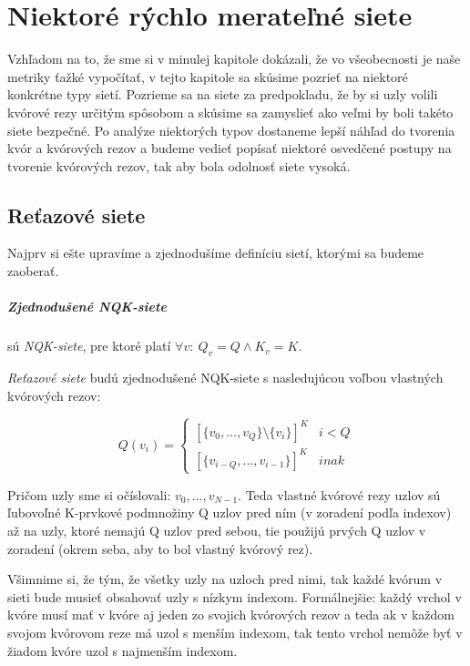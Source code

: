 \chapter{Niektoré rýchlo merateľné siete}

Vzhľadom na to, že sme si v minulej kapitole dokázali, že vo všeobecnosti
je naše metriky ťažké vypočítať, v tejto kapitole sa skúsime pozrieť na niektoré
konkrétne typy sietí. Pozrieme sa na siete za predpokladu, že by si uzly volili
kvórové rezy určitým spôsobom a skúsime sa zamyslieť ako veľmi by boli takéto
siete bezpečné.
Po analýze niektorých typov dostaneme lepší náhľad do tvorenia kvór a
kvórových rezov a budeme vedieť popísať niektoré osvedčené postupy na tvorenie
kvórových rezov, tak aby bola odolnosť siete vysoká.

\section {Reťazové siete}

Najprv si ešte upravíme a zjednodušíme definíciu sietí, ktorými sa budeme zaoberať.

\paragraph{Zjednodušené NQK-siete} sú \textit{NQK-siete}, pre ktoré platí
$\forall v:\:Q_v=Q\land K_v=K$.

\vspace{3mm}
\textit{Reťazové siete} budú zjednodušené NQK-siete s nasledujúcou voľbou
vlastných kvórových rezov:

$$Q(v_i)= \begin{cases}
            [\{v_0, ..., v_Q\} \setminus \{v_i\}]^K & i < Q \\
            [\{v_{i-Q}, ..., v_{i-1}\}]^K & inak
          \end{cases}$$

Pričom uzly sme si očíslovali: $v_0, ..., v_{N-1}$.
Teda vlastné kvórové rezy uzlov sú ľubovoľné K-prvkové podmnožiny Q uzlov pred ním
(v zoradení podľa indexov) až na uzly, ktoré nemajú Q uzlov pred sebou, tie
použijú prvých Q uzlov v zoradení (okrem seba, aby to bol vlastný kvórový rez).

Všimnime si, že tým, že všetky uzly  na uzloch pred nimi, tak
každé kvórum v sieti bude musieť obsahovať uzly s nízkym indexom.
Formálnejšie:
každý vrchol v kvóre musí mať v kvóre aj jeden zo svojich kvórových rezov
a teda ak v každom svojom kvórovom reze má uzol s menším indexom, tak
tento vrchol nemôže byť v žiadom kvóre uzol s najmenším indexom.

